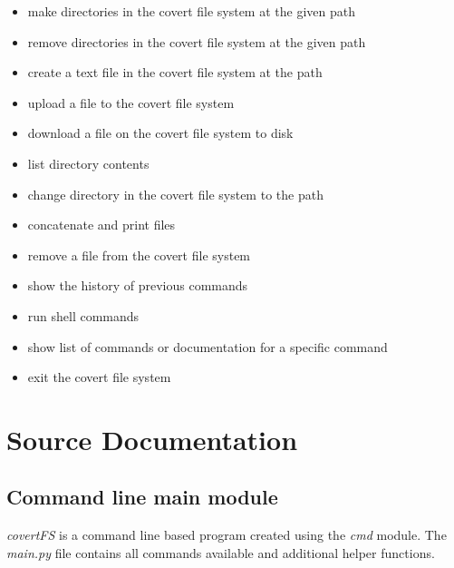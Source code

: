 \documentclass[letterpaper,12pt,openany,oneside]{sphinxmanual}
\begin{document}
\begin{itemize}
\begin{itemize}
\item {} 
 make directories in the covert file system at the given path

\item {} 
 remove directories in the covert file system at the given path

\item {} 
 create a text file in the covert file system at the path

\item {} 
 upload a file to the covert file system

\item {} 
 download a file on the covert file system to disk

\item {} 
 list directory contents

\item {} 
 change directory in the covert file system to the path

\item {} 
 concatenate and print files

\item {} 
 remove a file from the covert file system

\item {} 
 show the history of previous commands

\item {} 
 run shell commands

\item {} 
 show list of commands or documentation for a specific command

\item {} 
 exit the covert file system

\end{itemize}

\end{itemize}


\chapter{Source Documentation}
\label{index:source-documentation}

\section{Command line main module}
\label{main::doc}\label{main:command-line-main-module}
\emph{covertFS} is a command line based program created using the \emph{cmd} module. The \emph{main.py} file contains all commands available and additional helper functions.
\label{main:module-main}
\end{document}
